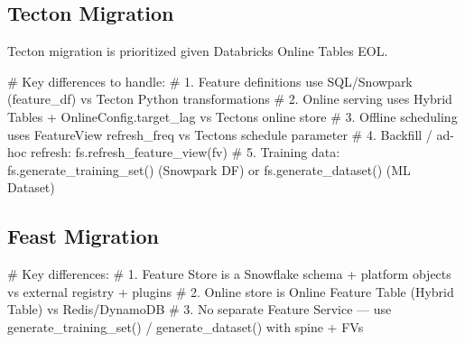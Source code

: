 \documentclass[
  letterpaper,
  DIV=11,
  numbers=noendperiod]{scrreprt}
\newenvironment{Shaded}{\begin{snugshade}}{\end{snugshade}}
\newcommand{\CommentTok}[1]{\textcolor[rgb]{0.37,0.37,0.37}{#1}}
\begin{document}
\hypertarget{tecton-migration}{%
\subsection{Tecton Migration}\label{tecton-migration}}

\begin{tcolorbox}[enhanced jigsaw, title=\textcolor{quarto-callout-note-color}{\faInfo}\hspace{0.5em}{Priority}, colbacktitle=quarto-callout-note-color!10!white, rightrule=.15mm, arc=.35mm, colframe=quarto-callout-note-color-frame, left=2mm, bottomtitle=1mm, toptitle=1mm, breakable, bottomrule=.15mm, opacityback=0, titlerule=0mm, toprule=.15mm, opacitybacktitle=0.6, colback=white, coltitle=black, leftrule=.75mm]

Tecton migration is prioritized given Databricks Online Tables EOL.

\end{tcolorbox}

\begin{Shaded}
\begin{Highlighting}[]
\CommentTok{\# Key differences to handle:}
\CommentTok{\# 1. Feature definitions use SQL/Snowpark (feature\_df) vs Tecton Python transformations}
\CommentTok{\# 2. Online serving uses Hybrid Tables + OnlineConfig.target\_lag vs Tecton\textquotesingle{}s online store}
\CommentTok{\# 3. Offline scheduling uses FeatureView refresh\_freq vs Tecton\textquotesingle{}s schedule parameter}
\CommentTok{\# 4. Backfill / ad{-}hoc refresh: fs.refresh\_feature\_view(fv)}
\CommentTok{\# 5. Training data: fs.generate\_training\_set() (Snowpark DF) or fs.generate\_dataset() (ML Dataset)}
\end{Highlighting}
\end{Shaded}

\hypertarget{feast-migration}{%
\subsection{Feast Migration}\label{feast-migration}}

\begin{Shaded}
\begin{Highlighting}[]
\CommentTok{\# Key differences:}
\CommentTok{\# 1. Feature Store is a Snowflake schema + platform objects vs external registry + plugins}
\CommentTok{\# 2. Online store is Online Feature Table (Hybrid Table) vs Redis/DynamoDB}
\CommentTok{\# 3. No separate Feature Service — use generate\_training\_set() / generate\_dataset() with spine + FVs}
\end{Highlighting}
\end{Shaded}
\end{document}
